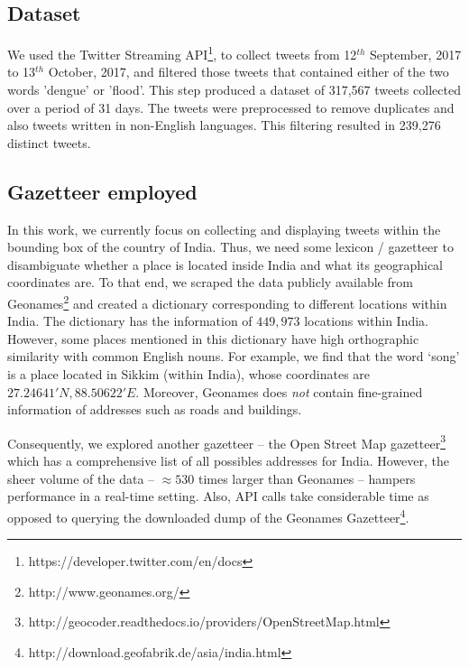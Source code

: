 \subsection{Dataset}

We used the Twitter Streaming API\footnote{https://developer.twitter.com/en/docs}, to collect tweets from 12$^{th}$ September, 2017 to 13$^{th}$ October, 2017, and filtered those tweets that contained either of the two words 'dengue' or 'flood'. 
This step produced a dataset of 317,567 tweets collected over a period of 31 days. The tweets were preprocessed to remove duplicates and also tweets written in non-English languages. 
This filtering resulted in 239,276 distinct tweets. 

\subsection{Gazetteer employed}

In this work, we currently focus on collecting and displaying tweets within the bounding box of the country of India. 
Thus, we need some lexicon / gazetteer to disambiguate whether a place is located inside India and what its geographical coordinates are. 
To that end, we scraped the data publicly available from Geonames\footnote{http://www.geonames.org/} and created a dictionary corresponding to different locations within India. 
The dictionary has the information of $449,973$ locations within India. 
However, some places mentioned in this dictionary have high orthographic similarity with common English nouns. For example, we find that 
the word `song' is a place located in Sikkim (within India), whose coordinates are \(27.24641 'N, 88.50622 'E\). Moreover, Geonames does {\it not} contain fine-grained information of addresses such as roads and buildings. 

Consequently, we explored another gazetteer -- 
the Open Street Map gazetteer\footnote{http://geocoder.readthedocs.io/providers/OpenStreetMap.html} 
which has a comprehensive list of all possibles addresses for India. However, the sheer volume of the data -- $\approx 530$ times larger than Geonames -- hampers performance in a real-time setting. 
Also, API calls take considerable time as opposed to querying the downloaded dump of the Geonames Gazetteer\footnote{http://download.geofabrik.de/asia/india.html}.

